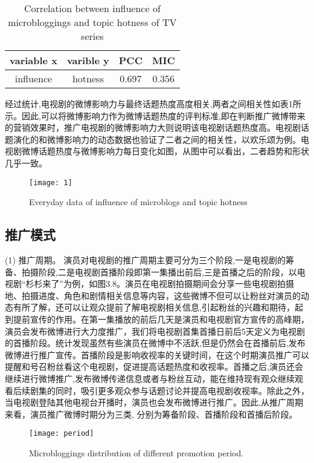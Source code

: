 \begin{table}[H]
\centering
\caption{Correlation between influence of microbloggings and topic hotness of TV series}
\begin{tabular}{|c|c|c|c|} \hline
variable x&varible y&PCC&MIC\\ \hline
influence&hotness&0.697&0.356\\
\hline\end{tabular}
\end{table}

经过统计,电视剧的微博影响力与最终话题热度高度相关,两者之间相关性如表1所示。因此,可以将微博影响力作为微博话题热度的评判标准,即在判断推广微博带来的营销效果时，推广电视剧的微博影响力大则说明该电视剧话题热度高。电视剧话题演化的和微博影响力的动态数据也验证了二者之间的相关性，以欢乐颂为例。电视剧微博话题热度与微博影响力每日变化如图，从图中可以看出，二者趋势和形状几乎一致。

\begin{figure}[!htbp]
\centering
\texttt{[image: 1]}
\caption{Everyday data of influence of microblogs and topic hotness}
\end{figure}



\subsection{推广模式}
(1) 推广周期。
演员对电视剧的推广周期主要可分为三个阶段,一是电视剧的筹备、拍摄阶段,二是电视剧首播阶段即第一集播出前后,三是首播之后的阶段，以电视剧“杉杉来了”为例，如图3.8。演员在电视剧拍摄期间会分享一些电视剧拍摄地、拍摄进度、角色和剧情相关信息等内容，这些微博不但可以让粉丝对演员的动态有所了解，还可以让观众提前了解电视剧相关信息,引起粉丝的兴趣和期待，起到提前宣传的作用。在第一集播放的前后几天是演员和电视剧官方宣传的高峰期，演员会发布微博进行大力度推广，我们将电视剧首集首播日前后5天定义为电视剧的首播阶段。统计发现虽然有些演员在微博中不活跃,但是仍然会在首播前后,发布微博进行推广宣传。首播阶段是影响收视率的关键时间，在这个时期演员推广可以提醒和号召粉丝看这个电视剧，促进提高话题热度和收视率。首播之后,演员还会继续进行微博推广,发布微博传递信息或者与粉丝互动，能在维持现有观众继续观看后续剧集的同时，吸引更多观众参与话题讨论并提高电视剧收视率。除此之外，当电视剧登陆其他电视台开播时，演员也会发布微博进行推广。因此,从推广周期来看，演员推广微博时期分为三类, 分别为筹备阶段、首播阶段和首播后阶段。
\begin{figure}[!htp]
\centering
\texttt{[image: period]}
\caption{Microbloggings distribution of different promotion period.}
\end{figure}

